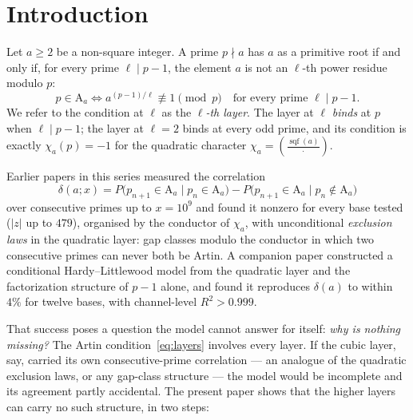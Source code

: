 \documentclass[11pt,reqno]{amsart}
\theoremstyle{plain}
\theoremstyle{definition}
\DeclareMathOperator{\sqf}{sqf}
\newcommand{\Art}{\mathrm{A}}
\newcommand{\legs}[2]{\left(\tfrac{#1}{#2}\right)}
\begin{document}
\section{Introduction}
\label{sec:intro}

Let $a \ge 2$ be a non-square integer. A prime $p \nmid a$ has $a$ as a
primitive root if and only if, for every prime $\ell \mid p - 1$, the element
$a$ is not an $\ell$-th power residue modulo $p$:
\begin{equation}
\label{eq:layers}
  p \in \Art_a
  \iff
  a^{(p-1)/\ell} \not\equiv 1 \pmod p
  \quad \text{for every prime } \ell \mid p - 1 .
\end{equation}
We refer to the condition at $\ell$ as the \emph{$\ell$-th layer}. The
layer at $\ell$ \emph{binds} at $p$ when $\ell \mid p - 1$; the layer at
$\ell = 2$ binds at every odd prime, and its condition is exactly
$\chi_a(p) = -1$ for the quadratic character $\chi_a = \legs{\sqf(a)}{\cdot}$.

Earlier papers in this series measured the correlation
\[
  \delta(a; x) = P\bigl(p_{n+1} \in \Art_a \mid p_n \in \Art_a\bigr)
               - P\bigl(p_{n+1} \in \Art_a \mid p_n \notin \Art_a\bigr)
\]
over consecutive primes up to $x = 10^9$ and found it nonzero for every base
tested ($|z|$ up to $479$), organised by the conductor of $\chi_a$, with
unconditional \emph{exclusion laws} in the quadratic layer: gap classes
modulo the conductor in which two consecutive primes can never both be Artin.
A companion paper constructed a conditional Hardy--Littlewood model from the
quadratic layer and the factorization structure of $p-1$ alone, and found it
reproduces $\delta(a)$ to within $4\%$ for twelve bases, with channel-level
$R^2 > 0.999$.

That success poses a question the model cannot answer for itself: \emph{why
is nothing missing?} The Artin condition~\eqref{eq:layers} involves every
layer. If the cubic layer, say, carried its own consecutive-prime
correlation --- an analogue of the quadratic exclusion laws, or any gap-class
structure --- the model would be incomplete and its agreement partly
accidental. The present paper shows that the higher layers can carry no such
structure, in two steps:
\end{document}
